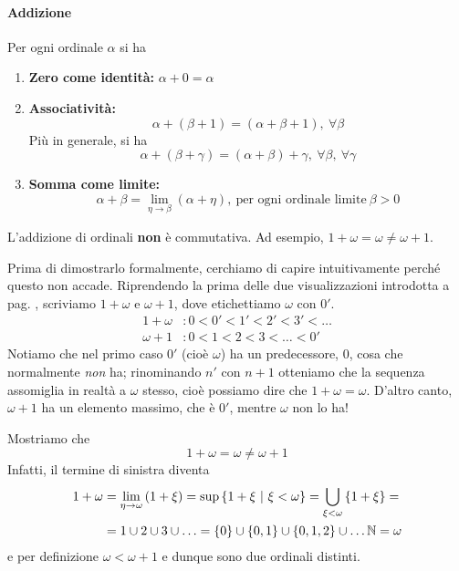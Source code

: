 \paragraph{Addizione}
\begin{define}
	Per ogni ordinale $\alpha$ si ha
	\begin{enumerate}
		\item \textbf{Zero come identità:}
		$\alpha+0=\alpha$
		\item \textbf{Associatività:}
		\begin{equation*}
			\alpha+\left(\beta+1\right)=\left(\alpha+\beta+1\right),\ \forall \beta
		\end{equation*}
		Più in generale, si ha
		\begin{equation*}
			\alpha+\left(\beta+\gamma\right)=\left(\alpha+\beta\right)+\gamma,\ \forall \beta,\ \forall\gamma
		\end{equation*}
		\item \textbf{Somma come limite:}
		\begin{equation*}
			\alpha+\beta=\lim_{\eta\to\beta}\left(\alpha+\eta\right),\ \text{per ogni ordinale limite}\ \beta>0
		\end{equation*}
	\end{enumerate}
\end{define}
\begin{attention}
	L'addizione di ordinali \textbf{non} è commutativa. Ad esempio, $1+\omega=\omega\neq\omega+1$.
\end{attention}
\begin{intuit}
	Prima di dimostrarlo formalmente, cerchiamo di capire intuitivamente perché questo non accade. Riprendendo la prima delle due visualizzazioni introdotta a pag. \pageref{visualizzazioneordinali}, scriviamo $1+\omega$ e $\omega+1$, dove etichettiamo $\omega$ con $0'$.
	\begin{align*}
		1+\omega&\colon0<0'<1'<2'<3'<\ldots\\
		\omega+1&\colon0<1<2<3<\ldots<0'
	\end{align*}
	Notiamo che nel primo caso $0'$ (cioè $\omega$) ha un predecessore, $0$, cosa che normalmente \textit{non} ha; rinominando $n'$ con $n+1$ otteniamo che la sequenza assomiglia in realtà a $\omega$ stesso, cioè possiamo dire che $1+\omega=\omega$. D'altro canto, $\omega+1$ ha un elemento massimo, che è $0'$, mentre $\omega$ non lo ha!
\end{intuit}
\begin{examplewt}
	Mostriamo che
	\begin{equation*}
		1+\omega=\omega\neq\omega+1
	\end{equation*}
 	Infatti, il termine di sinistra diventa
 	\begin{align*}
 		1+\omega&=\lim_{\eta\to \omega}\left(1+\xi\right)=\sup\left\{1+\xi \ \middle| \ \xi<\omega\right\}=\bigcup_{\xi<\omega}\left\{1+\xi\right\}=\\
 		&=1\cup 2\cup 3\cup \ldots=\{0\}\cup\{0,1\}\cup\{0,1,2\}\cup\ldots\naturalset=\omega
 	\end{align*}
 	e per definizione $\omega<\omega+1$ e dunque sono due ordinali distinti.
\end{examplewt}
